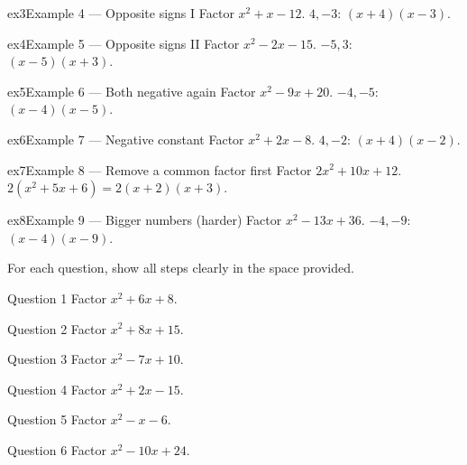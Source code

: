 \documentclass[11pt]{article}
\begin{document}
\begin{example}{ex3}{Example 4 --- Opposite signs I}
Factor $x^2+x-12$.
\soln $4,-3$: $(x+4)(x-3).$
\end{example}

\begin{example}{ex4}{Example 5 --- Opposite signs II}
Factor $x^2-2x-15$.
\soln $-5,3$: $(x-5)(x+3).$
\end{example}

\begin{example}{ex5}{Example 6 --- Both negative again}
Factor $x^2-9x+20$.
\soln $-4,-5$: $(x-4)(x-5).$
\end{example}

\begin{example}{ex6}{Example 7 --- Negative constant}
Factor $x^2+2x-8$.
\soln $4,-2$: $(x+4)(x-2).$
\end{example}

\begin{example}{ex7}{Example 8 --- Remove a common factor first}
Factor $2x^2+10x+12$.
\soln $2(x^2+5x+6)=2(x+2)(x+3).$
\end{example}

\begin{example}{ex8}{Example 9 --- Bigger numbers (harder)}
Factor $x^2-13x+36$.
\soln $-4,-9$: $(x-4)(x-9).$
\end{example}

\clearpage
{}
For each question, show all steps clearly in the space provided.

\begin{qbox}{Question 1}
Factor $x^2+6x+8$.\workspace{1.8cm}
\end{qbox}

\begin{qbox}{Question 2}
Factor $x^2+8x+15$.\workspace{1.8cm}
\end{qbox}

\begin{qbox}{Question 3}
Factor $x^2-7x+10$.\workspace{1.8cm}
\end{qbox}

\begin{qbox}{Question 4}
Factor $x^2+2x-15$.\workspace{1.8cm}
\end{qbox}

\begin{qbox}{Question 5}
Factor $x^2-x-6$.\workspace{1.8cm}
\end{qbox}

\begin{qbox}{Question 6}
Factor $x^2-10x+24$.\workspace{1.8cm}
\end{qbox}
\end{document}
